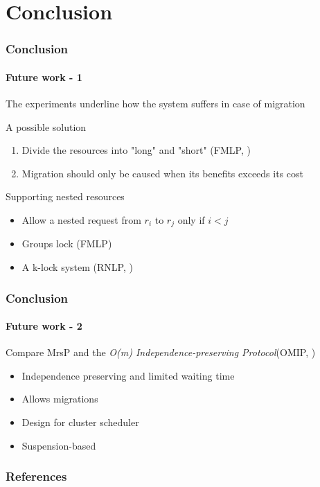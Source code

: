 \section{Conclusion}

\begin{frame}

	\frametitle{Conclusion}
	\framesubtitle{Future work - 1}

	The experiments underline how the system suffers in case of \alert{migration}

	\vspace{0.2cm}

	\begin{block}{A possible solution}
		\begin{enumerate}
			\item Divide the resources into "long" and "short" (FMLP, \cite{Block:2007:FRL:1306877.1307316})
			\item Migration should only be caused when its benefits exceeds its cost
		\end{enumerate}	
	\end{block}

	\vspace{0.4cm}

	Supporting \alert{nested resources}

	\begin{itemize}
		\item Allow a nested request from $r_i$ to $r_j$ only if $i < j$
		\item Groups lock (FMLP)
		\item A k-lock system (RNLP, \cite{DBLP:dblp_conf/ecrts/WardA12})
	\end{itemize}

\end{frame}

\begin{frame}

	\frametitle{Conclusion}
	\framesubtitle{Future work - 2}

	Compare MrsP and the \textit{O(m) Independence-preserving Protocol}(\alert{OMIP}, \cite{6602109})
	
	\vspace{0.2cm}

	\begin{itemize}
		\item Independence preserving and limited waiting time
		\item Allows migrations
		\item Design for cluster scheduler
		\item Suspension-based
	\end{itemize}

	\begin{figure}
		\centering
	\end{figure}
	

\end{frame}

\begin{frame}
        \frametitle{References}

        \fontsize{7pt}{7.2}\selectfont

        
		 
\end{frame}